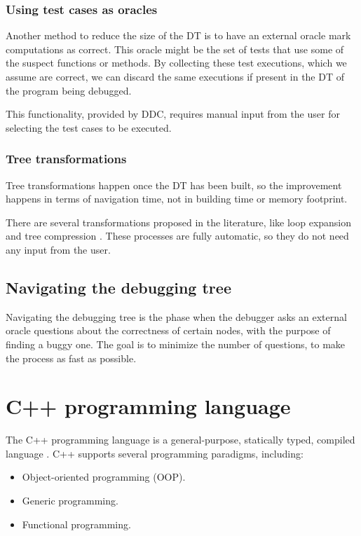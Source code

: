 \subsubsection{Using test cases as oracles}

Another method to reduce the size of the DT is to have an external oracle mark computations as correct.
This oracle might be the set of tests that use some of the suspect functions or methods. By collecting these test executions, which we assume are correct, we can discard the same executions if present in the DT of the program being debugged.

This functionality, provided by DDC, requires manual input from the user for selecting the test cases to be executed.


\subsubsection{Tree transformations}
Tree transformations happen once the DT has been built, so the improvement happens in terms of navigation time, not in building time or memory footprint.

There are several transformations proposed in the literature, like loop expansion and tree compression \cite{LoopExpansionTreeCompression}.
These processes are fully automatic, so they do not need any input from the user.

\subsection{Navigating the debugging tree}
Navigating the debugging tree is the phase when the debugger asks an external oracle questions about the correctness of certain nodes, with the purpose of finding a buggy one.
The goal is to minimize the number of questions, to make the process as fast as possible.
\section{C++ programming language}
The C++ programming language is a general-purpose, statically typed, compiled language \cite{cppHistory}.
%
C++ supports several programming paradigms, including:

\begin{itemize}
    \item Object-oriented programming (OOP).
    \item Generic programming.
    \item Functional programming.
\end{itemize}

